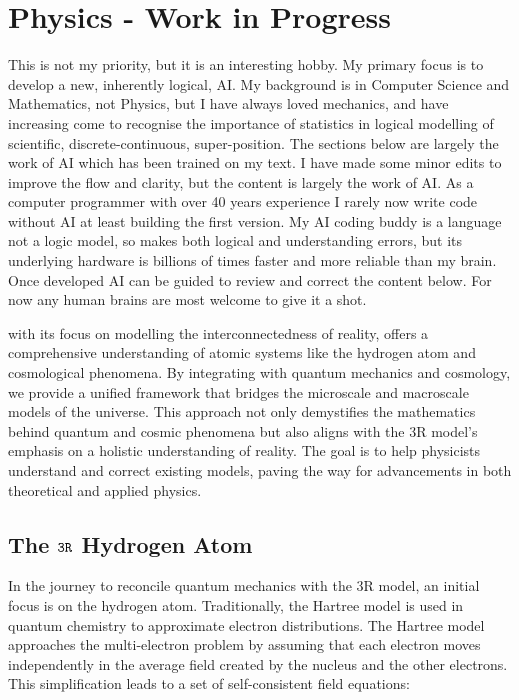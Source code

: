 \documentclass[12pt]{article}
\begin{document}
\section*{Physics - \iR{} Work in Progress}

This is not my priority, but it is an interesting hobby. My primary focus is to develop a new, inherently logical, \iR{} AI. My background is in Computer Science and Mathematics, not Physics, but I have always loved mechanics, and have increasing come to recognise the importance of statistics in logical modelling of scientific, discrete-continuous, super-position. The sections below are largely the work of AI which has been trained on my \iR{} text. I have made some minor edits to improve the flow and clarity, but the content is largely the work of AI. As a computer programmer with over 40 years experience I rarely now write code without AI at least building the first version. My AI coding buddy is a language not a logic model, so makes both logical and understanding errors, but its underlying hardware is billions of times faster and more reliable than my brain. Once developed \iR{} AI can be guided to review and correct the content below. For now any human brains are most welcome to give it a shot.

\iR{} with its focus on modelling the interconnectedness of reality, offers a comprehensive understanding of atomic systems like the hydrogen atom and cosmological phenomena. By integrating \iR{} with quantum mechanics and cosmology, we provide a unified framework that bridges the microscale and macroscale models of the universe. This approach not only demystifies the mathematics behind quantum and cosmic phenomena but also aligns with the 3R model's emphasis on a holistic understanding of reality. The goal is to help physicists understand and correct existing models, paving the way for advancements in both theoretical and applied physics.

\subsection*{The \(\texttt{3R}\) Hydrogen Atom}

In the journey to reconcile quantum mechanics with the 3R model, an initial focus is on the hydrogen atom. Traditionally, the Hartree model is used in quantum chemistry to approximate electron distributions. The Hartree model approaches the multi-electron problem by assuming that each electron moves independently in the average field created by the nucleus and the other electrons. This simplification leads to a set of self-consistent field equations:
\end{document}

